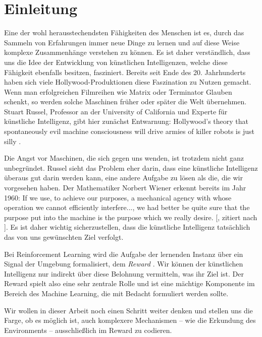 \chapter{Einleitung} \label{sec:introduction}
Eine der wohl herausstechendsten Fähigkeiten des Menschen ist es, durch das Sammeln von Erfahrungen immer neue Dinge zu lernen und auf diese Weise komplexe Zusammenhänge verstehen zu können. Es ist daher verständlich, dass uns die Idee der Entwicklung von künstlichen Intelligenzen, welche diese Fähigkeit ebenfalls besitzen, fasziniert. Bereits seit Ende des 20. Jahrhunderts haben sich viele Hollywood-Produktionen diese Faszination zu Nutzen gemacht. Wenn man erfolgreichen Filmreihen wie \glqq Matrix\grqq{} oder \glqq Terminator\grqq{} Glauben schenkt, so werden solche Maschinen früher oder später die Welt übernehmen. Stuart Russel, Professor an der University of California und Experte für künstliche Intelligenz, gibt hier zunächst Entwarnung: \glqq Hollywood's theory that spontaneously evil machine consciousness will drive armies of killer robots is just silly\grqq{} \cite{14_russell2016should}.

Die Angst vor Maschinen, die sich gegen uns wenden, ist trotzdem nicht ganz unbegründet. Russel sieht das Problem eher darin, dass eine künstliche Intelligenz überaus gut darin werden kann, eine andere Aufgabe zu lösen als die, die wir vorgesehen haben. Der Mathematiker Norbert Wiener erkennt bereits im Jahr 1960: \glqq If we use, to achieve our purposes, a mechanical agency with whose operation we cannot efficiently interfere..., we had better be quite sure that the purpose put into the machine is the purpose which we really desire.\grqq{} [\cite{14-2_wiener1960some}, zitiert nach \cite{14_russell2016should}]. Es ist daher wichtig sicherzustellen, dass die künstliche Intelligenz tatsächlich das von uns gewünschten Ziel verfolgt.

Bei Reinforcement Learning wird die Aufgabe der lernenden Instanz über ein Signal der Umgebung formalisiert, dem \textit{Reward} \cite{06_sutton2018reinforcement}. Wir können der künstlichen Intelligenz nur indirekt über diese Belohnung vermitteln, was ihr Ziel ist. Der Reward spielt also eine sehr zentrale Rolle und ist eine mächtige Komponente im Bereich des Machine Learning, die mit Bedacht formuliert werden sollte.

Wir wollen in dieser Arbeit noch einen Schritt weiter denken und stellen uns die Farge, ob es möglich ist, auch komplexere Mechanismen -- wie die Erkundung des Environments -- ausschließlich im Reward zu codieren.

